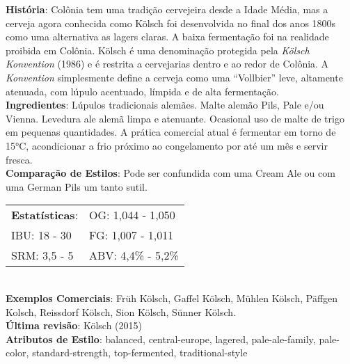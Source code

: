\textbf{História}: Colônia tem uma tradição cervejeira desde a Idade Média, mas a cerveja agora conhecida como Kölsch foi desenvolvida no final dos anos 1800s como uma alternativa as lagers claras. A baixa fermentação foi na realidade proibida em Colônia. Kölsch é uma denominação protegida pela \textit{Kölsch Konvention} (1986) e é restrita a cervejarias dentro e ao redor de Colônia. A \textit{Konvention} simplesmente define a cerveja como uma “Vollbier” leve, altamente atenuada, com lúpulo acentuado, límpida e de alta fermentação. \\
\textbf{Ingredientes}: Lúpulos tradicionais alemães. Malte alemão Pils, Pale e/ou Vienna. Levedura ale alemã limpa e atenuante. Ocasional uso de malte de trigo em pequenas quantidades. A prática comercial atual é fermentar em torno de 15°C, acondicionar a frio próximo ao congelamento por até um mês e servir fresca. \\
\textbf{Comparação de Estilos}: Pode ser confundida com uma Cream Ale ou com uma German Pils um tanto sutil. \\
\begin{tabular}{@{}p{35mm}p{35mm}@{}}
  \textbf{Estatísticas}: & OG: 1,044 - 1,050 \\
  IBU: 18 - 30  & FG: 1,007 - 1,011  \\
  SRM: 3,5 - 5  & ABV: 4,4\% - 5,2\%
\end{tabular}\\
\textbf{Exemplos Comerciais}: Früh Kölsch, Gaffel Kölsch, Mühlen Kölsch, Päffgen Kolsch, Reissdorf Kölsch, Sion Kölsch, Sünner Kölsch. \\
\textbf{Última revisão}: Kölsch (2015) \\
\textbf{Atributos de Estilo}: balanced, central-europe, lagered, pale-ale-family, pale-color, standard-strength, top-fermented, traditional-style
